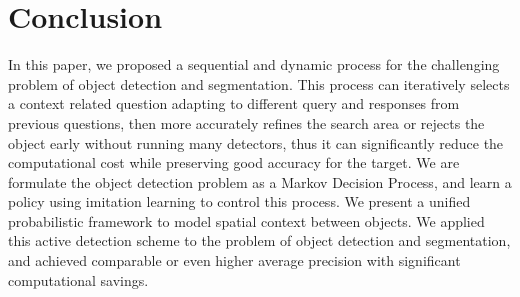 \section{Conclusion}
In this paper, we proposed a sequential and dynamic process for the challenging problem of object detection and segmentation. This process can iteratively selects a context related question adapting to different query and responses from previous questions, then more accurately refines the search area or rejects the object early without running many detectors, thus it can significantly reduce the computational cost while preserving good accuracy for the target. We are formulate the object detection problem as a Markov Decision Process, and learn a policy using imitation learning to control this process. We present a unified probabilistic framework to model spatial context between objects. We applied this active detection scheme to the problem of object detection and segmentation, and achieved comparable or even higher average precision with significant computational savings. 